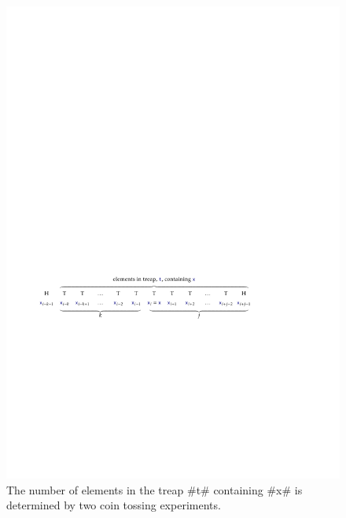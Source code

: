 \begin{figure}
  \begin{center}
    \includegraphics[width=\ScaleIfNeeded]{figs/yfast-sample}
  \end{center}
  \caption[The query time in a YFastTrie]{The number of elements in
  the treap #t# containing #x# is determined by two coin tossing
  experiments.}
\end{figure}

